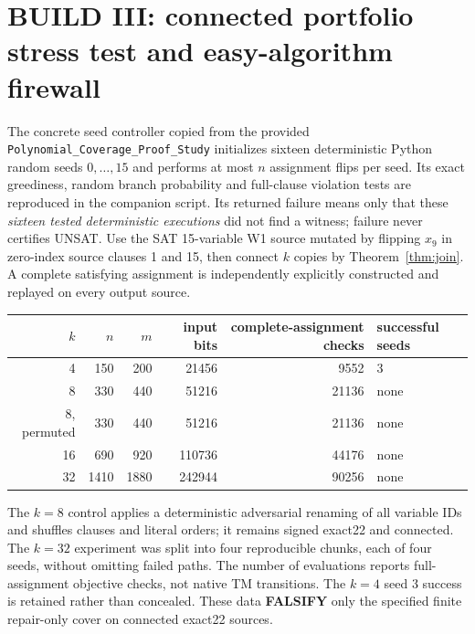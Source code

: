 \documentclass[10pt]{article}
\begin{document}
\section{BUILD III: connected portfolio stress test and easy-algorithm firewall}
The concrete seed controller copied from the provided \texttt{Polynomial\_Coverage\_Proof\_Study} initializes sixteen deterministic Python random seeds $0,\ldots,15$ and performs at most $n$ assignment flips per seed. Its exact greediness, random branch probability and full-clause violation tests are reproduced in the companion script. Its returned failure means only that these \emph{sixteen tested deterministic executions} did not find a witness; failure never certifies UNSAT. Use the SAT 15-variable W1 source mutated by flipping $x_9$ in zero-index source clauses 1 and 15, then connect $k$ copies by Theorem~\ref{thm:join}. A complete satisfying assignment is independently explicitly constructed and replayed on every output source.
\begin{center}\begin{tabular}{rrrrrl}\toprule
$k$ & $n$ & $m$ & input bits & complete-assignment checks & successful seeds\\\midrule
4 &150&200&21456&9552&3\\
8 &330&440&51216&21136&none\\
8, permuted &330&440&51216&21136&none\\
16&690&920&110736&44176&none\\
32&1410&1880&242944&90256&none\\\bottomrule\end{tabular}\end{center}
The $k=8$ control applies a deterministic adversarial renaming of all variable IDs and shuffles clauses and literal orders; it remains signed exact22 and connected. The $k=32$ experiment was split into four reproducible chunks, each of four seeds, without omitting failed paths. The number of evaluations reports full-assignment objective checks, not native TM transitions. The $k=4$ seed 3 success is retained rather than concealed. These data \textbf{FALSIFY} only the specified finite repair-only cover on connected exact22 sources.
\end{document}
